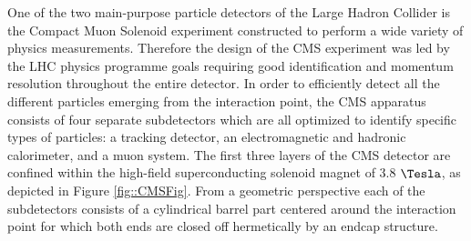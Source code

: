 One of the two main-purpose particle detectors of the Large Hadron Collider is the Compact Muon Solenoid experiment constructed to perform a wide variety of physics measurements. Therefore the design of the CMS experiment was led by the LHC physics programme goals requiring good identification and momentum resolution throughout the entire detector.
In order to efficiently detect all the different particles emerging from the interaction point, the CMS apparatus~\cite{CMSTDR} consists of four separate subdetectors which are all optimized to identify specific types of particles: a tracking detector, an electromagnetic and hadronic calorimeter, and a muon system. 
The first three layers of the CMS detector are confined within the high-field superconducting solenoid magnet of 3.8 $\Tesla$, as depicted in Figure \ref{fig::CMSFig}. 
From a geometric perspective each of the subdetectors consists of a cylindrical barrel part centered around the interaction point for which both ends are closed off hermetically by an endcap structure.
\\
